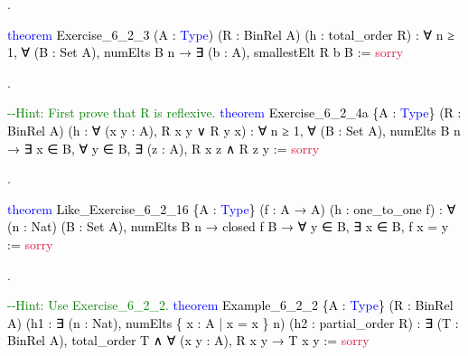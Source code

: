 \documentclass[
  letterpaper,
  DIV=11,
  numbers=noendperiod]{scrreprt}
\newenvironment{Shaded}{\begin{snugshade}}{\end{snugshade}}
\newcommand{\CommentTok}[1]{\textcolor[rgb]{0.37,0.37,0.37}{#1}}
\newcommand{\ConstantTok}[1]{\textcolor[rgb]{0.56,0.35,0.01}{#1}}
\newcommand{\KeywordTok}[1]{\textcolor[rgb]{0.00,0.23,0.31}{#1}}
\newcommand{\NormalTok}[1]{\textcolor[rgb]{0.00,0.23,0.31}{#1}}
\renewcommand{\NormalTok}[1]{\textcolor[HTML]{000000}{#1}}
\renewcommand{\KeywordTok}[1]{\textcolor[HTML]{0000FF}{#1}}
\renewcommand{\CommentTok}[1]{\textcolor[HTML]{008000}{#1}}
\renewcommand{\ConstantTok}[1]{\textcolor[HTML]{DC143C}{#1}}
\newcommand{\nobreakShaded}{\renewenvironment{Shaded}
	{\begin{tcolorbox}[frame hidden, enhanced, interior hidden, boxrule=0pt,
		borderline west={3pt}{0pt}{shadecolor}, sharp corners]}
	{\end{tcolorbox}}}
\newenvironment{numex}[1]
	{\begin{minipage}[t]{0.04\textwidth}\vspace{8pt}{#1}.
		\end{minipage}\nobreakShaded\begin{minipage}[t]{0.96\textwidth}\vspace{0pt}}
	{\end{minipage}}
\theoremstyle{remark}
\begin{document}
\begin{numex}{5}

\begin{Shaded}
\begin{Highlighting}[]
\KeywordTok{theorem}\NormalTok{ Exercise\_6\_2\_3 (A : }\KeywordTok{Type}\NormalTok{) (R : BinRel A)}
\NormalTok{    (h : total\_order R) : ∀ n ≥ 1, ∀ (B : Set A),}
\NormalTok{    numElts B n → ∃ (b : A), smallestElt R b B := }\ConstantTok{sorry}
\end{Highlighting}
\end{Shaded}

\end{numex}

\begin{numex}{6}

\begin{Shaded}
\begin{Highlighting}[]
\CommentTok{{-}{-}Hint:  First prove that R is reflexive.}
\KeywordTok{theorem}\NormalTok{ Exercise\_6\_2\_4a \{A : }\KeywordTok{Type}\NormalTok{\} (R : BinRel A)}
\NormalTok{    (h : ∀ (x y : A), R x y ∨ R y x) : ∀ n ≥ 1, ∀ (B : Set A),}
\NormalTok{    numElts B n → ∃ x ∈ B, ∀ y ∈ B, ∃ (z : A), R x z ∧ R z y := }\ConstantTok{sorry}
\end{Highlighting}
\end{Shaded}

\end{numex}

\begin{numex}{7}

\begin{Shaded}
\begin{Highlighting}[]
\KeywordTok{theorem}\NormalTok{ Like\_Exercise\_6\_2\_16 \{A : }\KeywordTok{Type}\NormalTok{\} (f : A → A)}
\NormalTok{    (h : one\_to\_one f) : ∀ (n : Nat) (B : Set A), numElts B n →}
\NormalTok{    closed f B → ∀ y ∈ B, ∃ x ∈ B, f x = y := }\ConstantTok{sorry}
\end{Highlighting}
\end{Shaded}

\end{numex}

\begin{numex}{8}

\begin{Shaded}
\begin{Highlighting}[]
\CommentTok{{-}{-}Hint:  Use Exercise\_6\_2\_2.}
\KeywordTok{theorem}\NormalTok{ Example\_6\_2\_2 \{A : }\KeywordTok{Type}\NormalTok{\} (R : BinRel A)}
\NormalTok{    (h1 : ∃ (n : Nat), numElts \{ x : A | x = x \} n)}
\NormalTok{    (h2 : partial\_order R) : ∃ (T : BinRel A),}
\NormalTok{      total\_order T ∧ ∀ (x y : A), R x y → T x y := }\ConstantTok{sorry}
\end{Highlighting}
\end{Shaded}

\end{numex}
\end{document}
